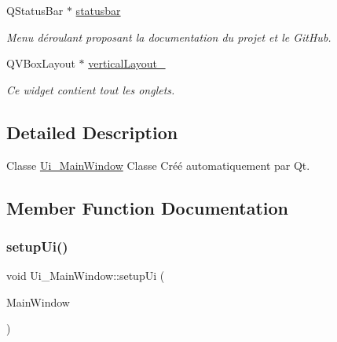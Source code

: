 \begin{DoxyCompactItemize}
\mbox{\label{classUi__MainWindow_a07519bbb9a350befd6feb4e84ef299fd}} 
Q\+Status\+Bar $\ast$ \hyperlink{classUi__MainWindow_a07519bbb9a350befd6feb4e84ef299fd}{statusbar}
\begin{DoxyCompactList}\small\item\em Menu d\'{e}roulant proposant la documentation du projet et le Git\+Hub. \end{DoxyCompactList}\item 
\mbox{\label{classUi__MainWindow_a38b8a4b887f3b58e2a49e7905ae6f1f0}} 
Q\+V\+Box\+Layout $\ast$ \hyperlink{classUi__MainWindow_a38b8a4b887f3b58e2a49e7905ae6f1f0}{vertical\+Layout\+\_}
\begin{DoxyCompactList}\small\item\em Ce widget contient tout les onglets. \end{DoxyCompactList}\end{DoxyCompactItemize}


\subsection{Detailed Description}
Classe \hyperlink{classUi__MainWindow}{Ui\+\_\+\+Main\+Window} Classe Cr\'{e}\'{e} automatiquement par Qt. 

\subsection{Member Function Documentation}
\mbox{\label{classUi__MainWindow_acf4a0872c4c77d8f43a2ec66ed849b58}} 
\subsubsection{\texorpdfstring{setup\+Ui()}{setupUi()}}
{\footnotesize\ttfamily void Ui\+\_\+\+Main\+Window\+::setup\+Ui (\begin{DoxyParamCaption}\item[{Q\+Main\+Window $\ast$}]{Main\+Window }\end{DoxyParamCaption})\hspace{0.3cm}{\ttfamily [inline]}}



